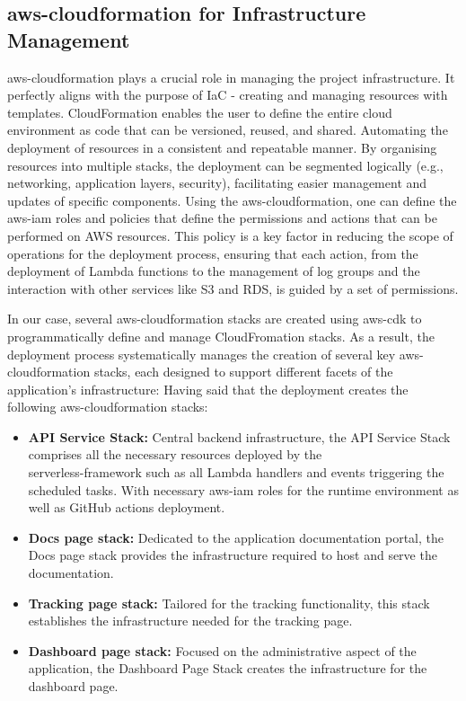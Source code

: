 \subsection{\gls{aws-cloudformation} for Infrastructure Management}
\label{subsec:aws-cloudformation-infrastructure}

\gls{aws-cloudformation} plays a crucial role in managing the project infrastructure.
It perfectly aligns with the purpose of \ac{IaC} - creating and managing resources with templates.
CloudFormation enables the user to define the entire cloud environment as code that can be versioned, reused, and shared. 
Automating the deployment of resources in a consistent and repeatable manner.
By organising resources into multiple stacks, the deployment can be segmented logically (e.g., networking, application layers, security), facilitating easier management and updates of specific components.
Using the \gls{aws-cloudformation}, one can define the \gls{aws-iam} roles and policies that define the permissions and actions that can be performed on \ac{AWS} resources.
This policy is a key factor in reducing the scope of operations for the deployment process, ensuring that each action, from the deployment of Lambda functions to the management of log groups and the interaction with other services like \ac{S3} and \ac{RDS}, is guided by a set of permissions. 

In our case, several \gls{aws-cloudformation} stacks are created using \gls{aws-cdk} to programmatically define and manage CloudFromation stacks.
As a result, the deployment process systematically manages the creation of several key \gls{aws-cloudformation} stacks, each designed to support different facets of the application's infrastructure:
Having said that the deployment creates the following \gls{aws-cloudformation} stacks:
\begin{itemize}
    \item \textbf{API Service Stack:} Central backend infrastructure, the API Service Stack comprises all the necessary resources deployed by the\\ \gls{serverless-framework} such as all Lambda handlers and events triggering the scheduled tasks.
    With necessary \gls{aws-iam} roles for the runtime environment as well as GitHub actions deployment.
    \item \textbf{Docs page stack:} Dedicated to the application documentation portal, the Docs page stack provides the infrastructure required to host and serve the documentation. 
    \item \textbf{Tracking page stack:} Tailored for the tracking functionality, this stack establishes the infrastructure needed for the tracking page.
    \item \textbf{Dashboard page stack:}  Focused on the administrative aspect of the application, the Dashboard Page Stack creates the infrastructure for the dashboard page. 
\end{itemize}

